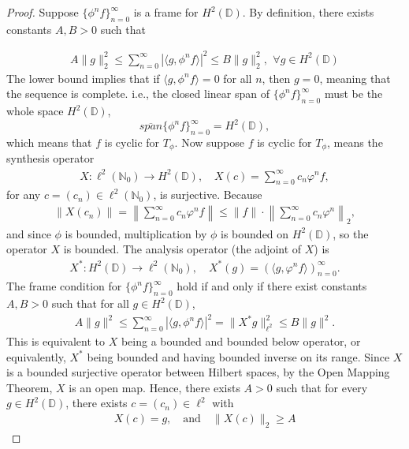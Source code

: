 \documentclass[12pt,titlepage]{amsart}
\theoremstyle{definition}
\theoremstyle{remark}
\begin{document}
\begin{proof}
Suppose $\{\phi^nf\}_{n=0}^{\infty}$ is a frame for
$H^2(\mathbb{D})$. By definition, there exists constants $A,B > 0$
such that

\begin{eqnarray*}
A \|g\|_2^2 \leq \sum_{n=0}^\infty |\langle g, \phi^n f \rangle|^2
\leq B \|g\|_2^2, \,\ \forall g \in H^2(\mathbb{D})
\end{eqnarray*}
The lower bound implies that if $\langle g, \phi^n f\rangle=0$ for
all $n$, then $g=0$, meaning that the sequence is complete. i.e.,
the closed linear span of $\{\phi^nf\}_{n=0}^{\infty}$ must be the
whole space $H^2(\mathbb{D})$,
$$\overline{span}\{\phi^nf\}_{n=0}^{\infty}=H^2(\mathbb{D}),$$
which means that $f$ is cyclic for $T_{\phi}$. Now suppose $f$ is
cyclic for $T_{\phi}$, means the synthesis operator
\begin{eqnarray*}
X: \ell^2(\mathbb{N}_0) \to H^2(\mathbb{D}), \quad X(c) =
\sum_{n=0}^\infty c_n \varphi^n f,
\end{eqnarray*}
for any $c=(c_n)\in \ell^2(\mathbb{N}_0)$, is surjective. Because
\begin{eqnarray*}
\| X(c_n) \| = \left\| \sum_{n=0}^\infty c_n \varphi^n f \right\|
\leq \|f\| \cdot \left\| \sum_{n=0}^\infty c_n \varphi^n
\right\|_{2},
\end{eqnarray*}
and since $\phi$ is bounded, multiplication by $\phi$ is bounded
on $H^2(\mathbb{D})$, so the operator $X$ is bounded. The analysis
operator (the adjoint of $X$) is
\begin{eqnarray*}
X^*: H^2(\mathbb{D}) \to \ell^2(\mathbb{N}_0), \quad X^*(g) =
(\langle g, \varphi^n f \rangle)_{n=0}^\infty.
\end{eqnarray*}
The frame condition for $\{\phi^n f\}_{n=0}^{\infty}$ hold if and
only if there exist constants $A,B>0$ such that for all $g \in
H^2(\mathbb{D})$,
\begin{eqnarray*}
A \|g\|^2 \leq \sum_{n=0}^\infty |\langle g, \phi^n f \rangle|^2 =
\|X^* g\|_{\ell^2}^2\leq B\|g\|^2.
\end{eqnarray*}
This is equivalent to $X$ being a bounded and bounded below
operator, or equivalently, $X^*$ being bounded and having bounded
inverse on its range. Since $X$ is a bounded surjective operator
between Hilbert spaces, by the Open Mapping Theorem, $X$ is an
open map. Hence, there exists $A>0$ such that for every $g \in
H^2(\mathbb{D})$, there exists $c = (c_n) \in \ell^2$ with
\begin{eqnarray*}
X(c) = g, \quad \text{and} \quad \|X(c)\|_{2} \geq A

\end{eqnarray*}
\end{proof}
\end{document}
